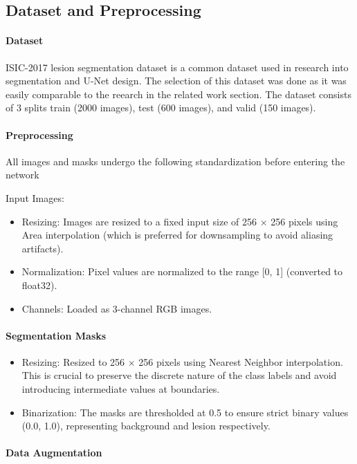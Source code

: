 \subsection{Dataset and Preprocessing}

\paragraph{Dataset}
ISIC-2017 lesion segmentation dataset is a common dataset used in research into segmentation and U-Net design. The selection of this dataset was done as it was easily comparable to the reearch in the related work section. The dataset consists of 3 splits train (2000 images), test (600 images), and valid (150 images). 

\paragraph{Preprocessing}
All images and masks undergo the following standardization before entering the network

Input Images:
\begin{itemize}
    \item Resizing: Images are resized to a fixed input size of 256 $\times$ 256 pixels using Area interpolation (which is preferred for downsampling to avoid aliasing artifacts).
    \item Normalization: Pixel values are normalized to the range [0, 1] (converted to float32).
    \item Channels: Loaded as 3-channel RGB images.
\end{itemize}



\paragraph{Segmentation Masks}

\begin{itemize}
    \item Resizing: Resized to 256 $\times$ 256 pixels using Nearest Neighbor interpolation. This is crucial to preserve the discrete nature of the class labels and avoid introducing intermediate values at boundaries.
    \item Binarization: The masks are thresholded at 0.5 to ensure strict binary values ({0.0, 1.0}), representing background and lesion respectively. 
\end{itemize}

\paragraph{Data Augmentation}

